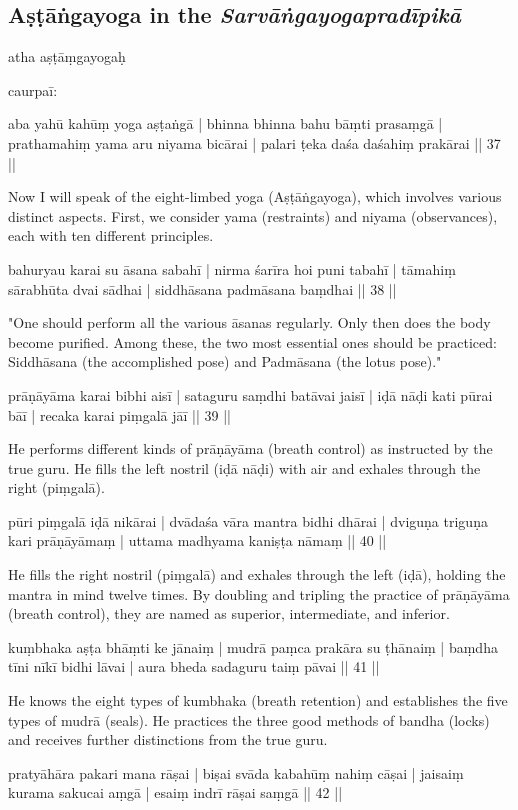 \subsection{Aṣṭāṅgayoga in the \textit{Sarvāṅgayogapradīpikā}}

atha aṣṭāṃgayogaḥ

caurpaī: 

aba yahū kahūṃ yoga aṣṭaṅgā | bhinna bhinna bahu bāṃti prasaṃgā |
prathamahiṃ yama aru niyama bicārai | palari ṭeka daśa daśahiṃ prakārai || 37 || 

Now I will speak of the eight-limbed yoga (Aṣṭāṅgayoga), which involves various distinct aspects. First, we consider yama (restraints) and niyama (observances), each with ten different principles.


bahuryau karai su āsana sabahī | nirma śarīra hoi puni tabahī |
tāmahiṃ sārabhūta dvai sādhai | siddhāsana padmāsana baṃdhai || 38 || 

"One should perform all the various āsanas regularly. Only then does the body become purified. Among these, the two most essential ones should be practiced: Siddhāsana (the accomplished pose) and Padmāsana (the lotus pose)."


prāṇāyāma karai bibhi aisī | sataguru saṃdhi batāvai jaisī |
iḍā nāḍi kati pūrai bāī | recaka karai piṃgalā jāī || 39 ||

He performs different kinds of prāṇāyāma (breath control) as instructed by the true guru. He fills the left nostril (iḍā nāḍi) with air and exhales through the right (piṃgalā).

pūri piṃgalā iḍā nikārai | dvādaśa vāra mantra bidhi dhārai |
dviguṇa triguṇa kari prāṇāyāmaṃ | uttama madhyama kaniṣṭa nāmaṃ || 40 ||

He fills the right nostril (piṃgalā) and exhales through the left (iḍā), holding the mantra in mind twelve times. By doubling and tripling the practice of prāṇāyāma (breath control), they are named as superior, intermediate, and inferior.

kuṃbhaka aṣṭa bhāṃti ke jānaiṃ | mudrā paṃca prakāra su ṭhānaiṃ |
baṃdha tīni nīkī bidhi lāvai | aura bheda sadaguru taiṃ pāvai || 41 ||

He knows the eight types of kumbhaka (breath retention) and establishes the five types of mudrā (seals). He practices the three good methods of bandha (locks) and receives further distinctions from the true guru.

pratyāhāra pakari mana rāṣai | biṣai svāda kabahūṃ nahiṃ cāṣai | 
jaisaiṃ kurama sakucai aṃgā | esaiṃ indrī rāṣai saṃgā || 42 ||

